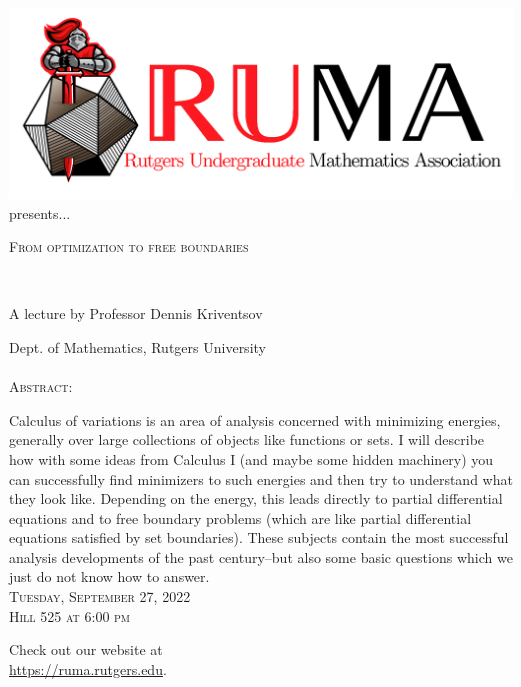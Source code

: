 \documentclass[12pt]{article}
\begin{document}

\begin{center}\includegraphics[scale=.3]{RUMAlogo.png}\\
\large  presents... \\

\vspace{2mm}
\begin{spacing}{1}
{\fontsize{26}{28}\selectfont  \textsc{
From optimization to free boundaries}} \end{spacing}
 
~~\\
\begin{spacing}{1.5}
{\fontsize{24}{24} \selectfont A lecture by Professor Dennis Kriventsov}  \end{spacing} 
\large Dept. of Mathematics, Rutgers University \\~~\\

\normalsize
\textsc{Abstract:}

\Large 
Calculus of variations is an area of analysis concerned with minimizing energies, generally over large collections of objects like functions or sets. I will describe how with some ideas from Calculus I (and maybe some hidden machinery) you can successfully find minimizers to such energies and then try to understand what they look like. Depending on the energy, this leads directly to partial differential equations and to free boundary problems (which are like partial differential equations satisfied by set boundaries). These subjects contain the most successful analysis developments of the past century--but also some basic questions which we just do not know how to answer.\\

\vspace{2.5mm} 
\huge   \textsc{Tuesday, September 27, 2022 \\Hill 525 at 6:00 pm} \\
\vspace{2.5mm}

\Large  Check out our website at \\
\url{https://ruma.rutgers.edu}.
\end{center}
\end{document}
